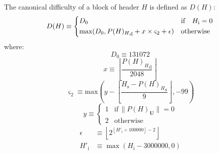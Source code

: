 \documentclass[9pt,oneside]{amsart}
\makeatletter
\newcommand{\linkdest}[1]{\Hy@raisedlink{\hypertarget{#1}{}}}
\makeatother
\begin{document}
\begin{multicols}{2}
\newcommand{\mindifficulty}{D_0}
\newcommand{\homesteadmod}{\ensuremath{\varsigma_2}}
\newcommand{\expdiffsymb}{\ensuremath{\epsilon}}
\newcommand{\diffadjustment}{x}

\hypertarget{block_difficulty_H__d}{}\linkdest{H__d}The canonical difficulty of a block of header $H$ is defined as $D(H)$:
\begin{equation}
D(H) \equiv \begin{dcases}
\mindifficulty & \text{if} \quad H_{\mathrm{i}} = 0\\
\text{max}\!\left(\mindifficulty, {P(H)_{H}}_{\mathrm{d}} + \diffadjustment\times\homesteadmod + \expdiffsymb \right) & \text{otherwise}\\
\end{dcases}
\end{equation}
where:
\begin{equation}
\mindifficulty \equiv 131072
\end{equation}
\begin{equation}
\diffadjustment \equiv \left\lfloor\frac{{P(H)_{H}}_{\mathrm{d}}}{2048}\right\rfloor
\end{equation}
\begin{equation}
\homesteadmod \equiv \text{max}\left( y - \left\lfloor\frac{H_{\mathrm{s}} - {P(H)_{H}}_{\mathrm{s}}}{9}\right\rfloor, -99 \right)
\end{equation}
\begin{equation*}
y \equiv \begin{cases}
1 & \text{if} \, \lVert P(H)_{\mathbf{U}}\rVert = 0 \\
2 & \text{otherwise}
\end{cases}
\end{equation*}
\begin{align}
\expdiffsymb &\equiv \left\lfloor 2^{ \left\lfloor H'_{\mathrm{i}} \div 100000 \right\rfloor - 2 } \right\rfloor \\
H'_{\mathrm{i}} &\equiv \max(H_{\mathrm{i}} - 3000000, 0)
\end{align}


\end{multicols}
\end{document}
